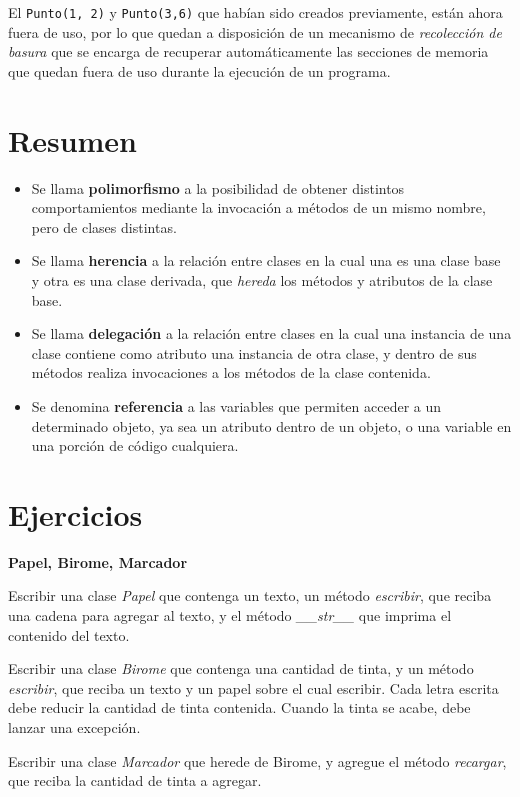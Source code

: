 \begin{observacion}
El \lstinline!Punto(1, 2)! y \lstinline!Punto(3,6)! que habían sido creados
previamente, están ahora fuera de uso, por lo que quedan a disposición de un
mecanismo de {\it recolección de basura} que se encarga de recuperar
automáticamente las secciones de memoria que quedan fuera de uso durante la
ejecución de un programa.
\end{observacion}

\section{Resumen}

\begin{itemize}
\item Se llama {\bf polimorfismo} a la posibilidad de obtener distintos
comportamientos mediante la invocación a métodos de un mismo nombre, pero de
clases distintas.

\item Se llama {\bf herencia} a la relación entre clases en la cual una es una
clase base y otra es una clase derivada, que {\it hereda} los métodos y
atributos de la clase base.

\item Se llama {\bf delegación} a la relación entre clases en la cual una
instancia de una clase contiene como atributo una instancia de otra clase,
y dentro de sus métodos realiza invocaciones a los métodos de la clase
contenida.

\item Se denomina {\bf referencia} a las variables que permiten acceder a
un determinado objeto, ya sea un atributo dentro de un objeto, o una
variable en una porción de código cualquiera.
\end{itemize}


\newpage
\section{Ejercicios}

\begin{ejercicio}
{\bf Papel, Birome, Marcador}
\begin{partes}
    \item Escribir una clase {\it Papel} que contenga un texto, un método {\it
escribir}, que reciba una cadena para agregar al texto, y el método {\it
\_\_str\_\_} que imprima el contenido del texto.
    \item Escribir una clase {\it Birome} que contenga una cantidad de tinta, y
un método {\it escribir}, que reciba un texto y un papel sobre el cual
escribir. Cada letra escrita debe reducir la cantidad de tinta contenida.
Cuando la tinta se acabe, debe lanzar una excepción.
    \item Escribir una clase {\it Marcador} que herede de Birome, y agregue el
método {\it recargar}, que reciba la cantidad de tinta a agregar.
\end{partes}
\end{ejercicio}


